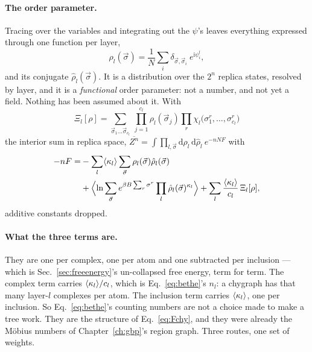 \paragraph{The order parameter.} Tracing over the variables and integrating out
the $\psi$'s leaves everything expressed through one function per layer,
\begin{equation}
  \rho_{l}(\vec\sigma)=\frac{1}{N}\sum_{i}
     \delta_{\vec\sigma,\vec\sigma_{i}}\ e^{\mathrm{i}\psi^{l}_{i}},
  \label{eq:rhochy}
\end{equation}
and its conjugate $\hat\rho_{l}(\vec\sigma)$. It is a distribution over the
$2^{n}$ replica states, resolved by layer, and it is a \emph{functional} order
parameter: not a number, and not yet a field. Nothing has been assumed about it.
With
\begin{equation}
  \Xi_{l}[\rho]=\!\!\sum_{\vec\sigma_{1}\dots\vec\sigma_{c_{l}}}\
    \prod_{j=1}^{c_{l}}\rho_{l}(\vec\sigma_{j})
    \prod_{r}\chi_{l}\bigl(\sigma^{r}_{1},\dots,\sigma^{r}_{c_{l}}\bigr)
  \label{eq:Xichy}
\end{equation}
the interior sum in replica space, $\overline{Z^{n}}=\int\prod_{l,\vec\sigma}
\mathrm{d}\rho_{l}\,\mathrm{d}\hat\rho_{l}\ e^{-nNF}$ with
\begin{equation}
  \begin{aligned}
  -nF=&-\sum_{l}\langle \kappa_{l} \rangle\sum_{\vec\sigma}
        \rho_{l}(\vec\sigma)\hat\rho_{l}(\vec\sigma)\\
      &+\Bigl\langle\ln\sum_{\vec\sigma}e^{\beta B\sum_{r}\sigma^{r}}
        \prod_{l}\hat\rho_{l}(\vec\sigma)^{\kappa_{l}}\Bigr\rangle
       +\sum_{l}\frac{\langle \kappa_{l} \rangle}{c_{l}}\,\Xi_{l}[\rho],
  \end{aligned}
  \label{eq:Fchy}
\end{equation}
additive constants dropped.

\paragraph{What the three terms are.} They are one per complex, one per atom and
one subtracted per inclusion --- which is Sec.~\ref{sec:freeenergy}'s
un-collapsed free energy, term for term. The complex term carries
$\langle \kappa_{l} \rangle/c_{l}$, which is Eq.~\eqref{eq:bethe}'s $n_{l}$: a chygraph
has that many layer-$l$ complexes per atom. The inclusion term carries
$\langle \kappa_{l} \rangle$, one per inclusion. So Eq.~\eqref{eq:bethe}'s counting
numbers are not a choice made to make a tree work. They are the structure of
Eq.~\eqref{eq:Fchy}, and they were already the M\"obius numbers of
Chapter~\ref{ch:gbp}'s region graph. Three routes, one set of weights.

